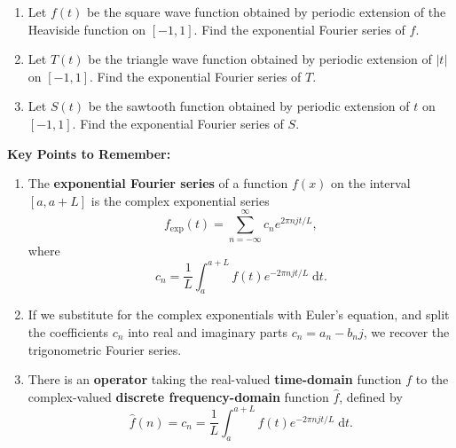 \documentclass{article}
\newcommand{\diff}{\;\mathrm{d}}
\begin{document}
\begin{enumerate}
	\item Let $f(t)$ be the square wave function obtained by periodic extension of the Heaviside function on $[-1,1]$. Find the exponential Fourier series of $f$.
	\item Let $T(t)$ be the triangle wave function obtained by periodic extension of $|t|$ on $[-1,1]$. Find the exponential Fourier series of $T$.
	\item Let $S(t)$ be the sawtooth function obtained by periodic extension of $t$ on $[-1,1]$. Find the exponential Fourier series of $S$.
\end{enumerate}



















\clearpage




{\bf Key Points to Remember:}

\vspace{5mm}

\begin{enumerate}
	\item The \textbf{exponential Fourier series} of a function $f(x)$ on the interval $[a,a+L]$ is the complex exponential series
		\[f_\mathrm{exp}(t)=\sum_{n=-\infty}^\infty c_ne^{2\pi njt/L},\]
		where
		\[c_n = \frac{1}{L}\int_a^{a+L}\!\! f(t)e^{-2\pi njt/L}\diff t.\]
	\item If we substitute for the complex exponentials with Euler's equation, and split the coefficients $c_n$ into real and imaginary parts $c_n=a_n-b_nj$, we recover the trigonometric Fourier series.
	\item There is an \textbf{operator} taking the real-valued \textbf{time-domain} function $f$ to the complex-valued \textbf{discrete frequency-domain} function $\hat{f}$, defined by
		\[\hat{f}(n)=c_n=\frac{1}{L}\int_a^{a+L}\!\!f(t)e^{-2\pi njt/L}\diff t.\]
\end{enumerate}
\end{document}

